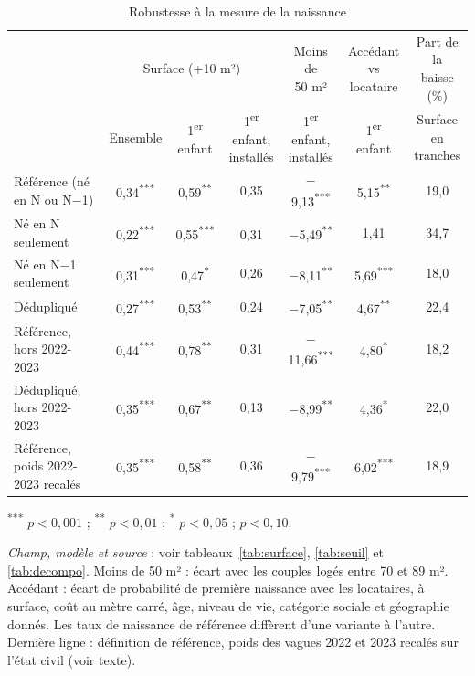 \documentclass[11pt,a4paper]{article}
\theoremstyle{plain}
\theoremstyle{definition}
\theoremstyle{remark}
\newcommand{\sym}[1]{\textsuperscript{#1}}
\begin{document}
\begin{table}[htbp]
\centering\footnotesize
\setlength{\tabcolsep}{4pt}
\begin{threeparttable}
\caption{Robustesse à la mesure de la naissance}\label{tab:fpr}
\begin{tabular}{@{}lcccccc@{}}
\toprule
& \multicolumn{3}{c}{Surface (+10 m²)} & \shortstack{Moins de\\50 m²} & \shortstack{Accédant vs\\locataire} & \shortstack{Part de la\\baisse (\%)} \\
\cmidrule(lr){2-4}
& Ensemble & 1\textsuperscript{er} enfant & \shortstack{1\textsuperscript{er} enfant,\\installés} & \shortstack{1\textsuperscript{er} enfant,\\installés} & 1\textsuperscript{er} enfant & \shortstack{Surface en\\tranches} \\
\midrule
Référence (né en N ou N$-$1)   & 0,34\sym{***} & 0,59\sym{**} & 0,35 & $-$9,13\sym{***} & 5,15\sym{**} & 19,0 \\
Né en N seulement              & 0,22\sym{***} & 0,55\sym{***} & 0,31\sym{\dag} & $-$5,49\sym{**} & 1,41 & 34,7 \\
Né en N$-$1 seulement          & 0,31\sym{***} & 0,47\sym{*} & 0,26 & $-$8,11\sym{**} & 5,69\sym{***} & 18,0 \\
Dédupliqué                     & 0,27\sym{***} & 0,53\sym{**} & 0,24 & $-$7,05\sym{**} & 4,67\sym{**} & 22,4 \\
Référence, hors 2022-2023      & 0,44\sym{***} & 0,78\sym{**} & 0,31 & $-$11,66\sym{***} & 4,80\sym{*} & 18,2 \\
Dédupliqué, hors 2022-2023     & 0,35\sym{***} & 0,67\sym{**} & 0,13 & $-$8,99\sym{**} & 4,36\sym{*} & 22,0 \\
\addlinespace
Référence, poids 2022-2023 recalés & 0,35\sym{***} & 0,58\sym{**} & 0,36 & $-$9,79\sym{***} & 6,02\sym{***} & 18,9 \\
\bottomrule
\end{tabular}
\begin{tablenotes}\scriptsize
\item \sym{***} $p<0{,}001$ ; \sym{**} $p<0{,}01$ ; \sym{*} $p<0{,}05$ ; \sym{\dag} $p<0{,}10$.
\item \textit{Champ, modèle et source} : voir tableaux~\ref{tab:surface}, \ref{tab:seuil} et \ref{tab:decompo}. Moins de 50 m² : écart avec les couples logés entre 70 et 89 m². Accédant : écart de probabilité de première naissance avec les locataires, à surface, coût au mètre carré, âge, niveau de vie, catégorie sociale et géographie donnés. Les taux de naissance de référence diffèrent d'une variante à l'autre. Dernière ligne : définition de référence, poids des vagues 2022 et 2023 recalés sur l'état civil (voir texte).
\end{tablenotes}
\end{threeparttable}
\end{table}
\end{document}

